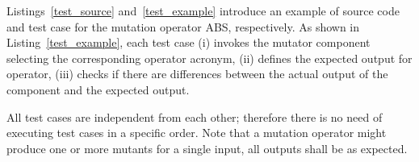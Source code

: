 Listings~\ref{test_source} and~\ref{test_example} introduce an example of source code and test case for the mutation operator ABS, respectively. As shown in Listing~\ref{test_example}, each test case (i) invokes the mutator component selecting the corresponding operator acronym, (ii) defines the expected output for operator, (iii) checks if there are differences between the actual output of the component and the expected output.

All test cases are independent from each other; therefore there is no need of executing test cases in a specific order.
Note that a mutation operator might produce one or more mutants for a single input, all outputs shall be as expected.



